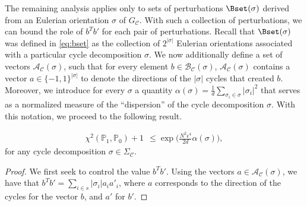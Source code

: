 \documentclass[10pt]{article}
\begin{document}
\begin{ReviewVerbatim}
	The remaining analysis applies only to sets of perturbations $\Bset(\sigma)$ derived from an Eulerian orientation $\sigma$ of $G_\mathcal{C}$. With such a collection of perturbations, we can bound the role of $b^Tb'$ for each pair of perturbations. Recall that $\Bset(\sigma)$ was defined in \eqref{eq:bset} as the collection of $2^{|\sigma|}$ Eulerian orientations associated with a particular cycle decomposition $\sigma$. We now additionally define a set of vectors $\mathcal{A}_\mathcal{C}(\sigma)$, such that for every element $b \in \mathcal{B}_\mathcal{C}(\sigma)$, $\mathcal{A}_\mathcal{C}(\sigma)$ contains a vector $a \in \lbrace -1, 1\rbrace^{|\sigma|}$ to denote the directions of the $|\sigma|$ cycles that created $b$. Moreover, we introduce for every $\sigma$ a quantity $\alpha(\sigma) = \frac{1}{d} \sum_{\sigma_i \in \sigma}|\sigma_i|^2$ that serves as a normalized measure of the ``dispersion'' of the cycle decomposition $\sigma$. With this notation, we proceed to the following result.
	\begin{lemma}
		\label{lemma:bound2}
		\begin{align*}
		\chi^2(\mathbb{P}_1,\mathbb{P}_0) + 1
		\ \ \le \exp\Big(\frac{N^2 \epsilon^4}{2d} \alpha(\sigma) \Big),
		\end{align*}
		for any cycle decomposition $\sigma \in \Sigma_\mathcal{C}$.
	\end{lemma}
	\begin{proof}
		We first seek to control the value $b^Tb'$. Using the vectors $a \in \mathcal{A}_\mathcal{C}(\sigma)$, we have that $b^Tb' = \sum_{i \in s} |\sigma_i| a_i a'_i$, where $a$ corresponds to the direction of the cycles for the vector $b$, and $a'$ for $b'$.


\end{proof}
\end{ReviewVerbatim}
\end{document}
